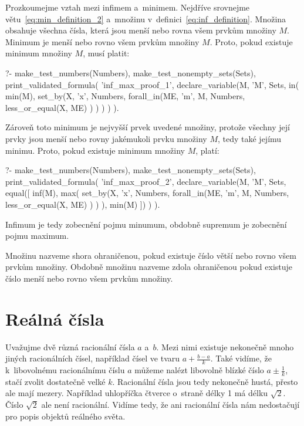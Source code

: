 Prozkoumejme vztah mezi infimem a~minimem. Nejdříve srovnejme větu~\eqref{eq:min_definition_2} a~množinu v~definici~\eqref{eq:inf_definition}. Množina obsahuje všechna čísla, která jsou menší nebo rovna všem prvkům množiny \(M\). Minimum je menší nebo rovno všem prvkům množiny \(M\). Proto, pokud existuje minimum množiny \(M\), musí platit:

\begin{prolog}
?-	make_test_numbers(Numbers),
	make_test_nonempty_sets(Sets),
	print_validated_formula(
		'inf_max_proof_1',
		declare_variable(M, 'M', Sets,
			in(
				min(M),
				set_by(X, 'x', Numbers, 
					forall_in(ME, 'm', M, Numbers,
						less_or_equal(X, ME)
					)				
				)
			)
		)
	).
\end{prolog}

Zároveň toto minimum je nejvyšší prvek uvedené množiny, protože všechny její prvky jsou menší nebo rovny jakémukoli prvku množiny \(M\), tedy také jejímu minimu. Proto, pokud existuje minimum množiny \(M\), platí:

\begin{prolog}
?-	make_test_numbers(Numbers),
	make_test_nonempty_sets(Sets),
	print_validated_formula(
		'inf_max_proof_2',
		declare_variable(M, 'M', Sets,
			equal([
				inf(M),
				max(
					set_by(X, 'x', Numbers, 
						forall_in(ME, 'm', M, Numbers,
							less_or_equal(X, ME)
						)
					)
				),
				min(M)
			])
		)
	).
\end{prolog}

Infimum je tedy zobecnění pojmu minumum, obdobně supremum je zobecnění pojmu maximum.

Množinu nazveme shora ohraničenou, pokud existuje číslo větší nebo rovno všem prvkům množiny. Obdobně množinu nazveme zdola ohraničenou pokud existuje číslo menší nebo rovno všem prvkům množiny.

\section{Reálná čísla}

Uvažujme dvě různá racionální čísla \(a\) a~\(b\). Mezi nimi existuje nekonečně mnoho jiných racionálních čísel, například čísel ve tvaru \(a + \frac{b - a}{k}\). Také vidíme, že k~libovolnému racionálnímu číslu \(a\) můžeme nalézt libovolně blízké číslo \(a \pm \frac{1}{k}\), stačí zvolit dostatečně velké \(k\). Racionální čísla jsou tedy nekonečně hustá, přesto ale mají mezery. Například uhlopříčka čtverce o~straně délky 1 má délku \(\sqrt{2}\). Číslo \(\sqrt{2}\) ale není racionální. Vidíme tedy, že ani racionální čísla nám nedostačují pro popis objektů reálného světa.

